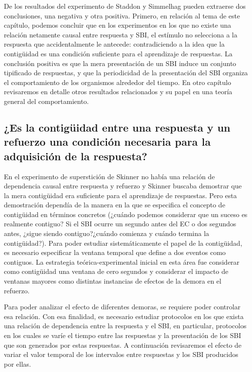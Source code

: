 \documentclass[
  a4paper,
  DIV=11,
  numbers=noendperiod]{scrreprt}
\begin{document}
De los resultados del experimento de Staddon y Simmelhag pueden
extraerse dos conclusiones, una negativa y otra positiva. Primero, en
relación al tema de este capítulo, podemos concluir que en los
experimentos en los que no existe una relación netamente causal entre
respuesta y SBI, el estímulo no selecciona a la respuesta que
accidentalmente le antecede: contradiciendo a la idea que la contigüidad
es una condición suficiente para el aprendizaje de respuestas. La
conclusión positiva es que la mera presentación de un SBI induce un
conjunto tipificado de respuestas, y que la periodicidad de la
presentación del SBI organiza el comportamiento de los organismos
alrededor del tiempo. En otro capítulo revisaremos en detalle otros
resultados relacionados y su papel en una teoría general del
comportamiento.

\subsection{¿Es la contigüidad entre una respuesta y un refuerzo una
condición necesaria para la adquisición de la
respuesta?}\label{es-la-contiguxfcidad-entre-una-respuesta-y-un-refuerzo-una-condiciuxf3n-necesaria-para-la-adquisiciuxf3n-de-la-respuesta}

En el experimento de superstición de Skinner no había una relación de
dependencia causal entre respuesta y refuerzo y Skinner buscaba
demostrar que la mera contigüidad era suficiente para el aprendizaje de
respuestas. Pero esta demostración dependía de la manera en la que se
especifica el concepto de contigüidad en términos concretos (¿cuándo
podemos considerar que un suceso es realmente contiguo? Si el SBI ocurre
un segundo antes del EC o dos segundos antes, ¿sigue siendo
contiguo?¿cuándo comienza y cuándo termina la contigüidad?). Para poder
estudiar sistemáticamente el papel de la contigüidad, es necesario
especificar la ventana temporal que define a dos eventos como contiguos.
La estrategia teórica-experimental inicial en esta área fue considerar
como contigüidad una ventana de cero segundos y considerar el impacto de
ventanas mayores como distintas instancias de efectos de la demora en el
refuerzo.

Para poder analizar el efecto de diferentes demoras, se requiere poder
controlar esa relación. Con esa finalidad, es necesario estudiar
protocolos en los que exista una relación de dependencia entre la
respuesta y el SBI, en particular, protocolos en los cuales se varíe el
tiempo entre las respuestas y la presentación de los SBI que son
generados por estas respuestas. A continuación revisaremos el efecto de
variar el valor temporal de los intervalos entre respuestas y los SBI
producidos por ellas.
\end{document}
